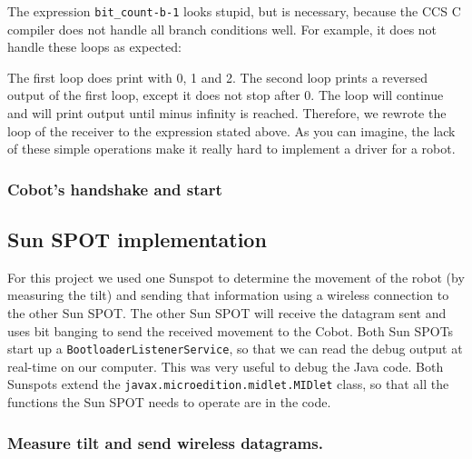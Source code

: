 \documentclass[a4paper,10pt]{article} %
\begin{document}


\noindent The expression \texttt{bit\_count-b-1} looks stupid, but is necessary,
because the CCS C compiler does not handle all branch conditions well. For
example, it does not handle these loops as expected:



\noindent The first loop does print  with 0, 1 and 2. The second loop
prints a reversed output of the first loop, except it does not stop after 0. The
loop will continue and will print output until minus infinity is reached.
Therefore, we rewrote the loop of the receiver to the expression stated above.
As you can imagine, the lack of these simple operations make it really hard to
implement a driver for a robot.


\subsubsection{Cobot's handshake and start} %
\label{ssub:Cobot's handshake and start}





\subsection{Sun SPOT implementation} %
\label{sub:Sun SPOT implementation}

For this project we used one Sunspot to determine the movement of the robot (by
measuring the tilt) and sending that information using a wireless connection to
the other Sun SPOT. The other Sun SPOT will receive the datagram sent and uses
bit banging to send the received movement to the Cobot. Both Sun SPOTs start up
a \texttt{BootloaderListenerService}, so that we can read the debug output at
real-time on our computer. This was very useful to debug the Java code. Both
Sunspots extend the \texttt{javax.microedition.midlet.MIDlet} class, so that all
the functions the Sun SPOT needs to operate are in the code.


\subsubsection{Measure tilt and send wireless datagrams.} %
\end{document}
